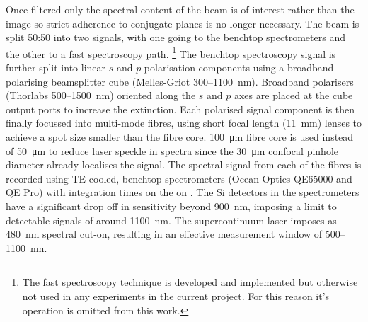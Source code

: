 \documentclass{article}
\begin{document}
Once filtered only the spectral content of the beam is of interest rather than the image so strict adherence to conjugate planes is no longer necessary. The beam is split 50:50 into two signals, with one going to the benchtop spectrometers and the other to a fast spectroscopy path.%
\footnote{The fast spectroscopy technique is developed and implemented but otherwise not used in any experiments in the current project. For this reason it's operation is omitted from this work.}
The benchtop spectroscopy signal is further split into linear $s$ and $p$ polarisation components using a broadband polarising beamsplitter cube (Melles-Griot 300--\SI{1100}{nm}). Broadband polarisers (Thorlabs 500--\SI{1500}{nm}) oriented along the $s$ and $p$ axes are placed at the cube output ports to increase the extinction. Each polarised signal component is then finally focussed into multi-mode fibres, using short focal length (\SI{11}{mm}) lenses to achieve a spot size smaller than the fibre core. \SI{100}{\micro\metre} fibre core is used instead of \SI{50}{\micro\metre} to reduce laser speckle in spectra since the \SI{30}{\micro\metre} confocal pinhole diameter already localises the signal.
The spectral signal from each of the fibres is recorded using TE-cooled, benchtop spectrometers (Ocean Optics QE65000 and QE Pro) with integration times on the on . The Si detectors in the spectrometers have a significant drop off in sensitivity beyond \SI{900}{nm}, imposing a limit to detectable signals of around \SI{1100}{nm}. The supercontinuum laser imposes as \SI{480}{nm} spectral cut-on, resulting in an effective measurement window of 500--\SI{1100}{nm}.
\end{document}
